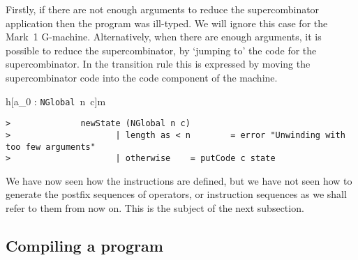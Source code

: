 Firstly, if there are not enough arguments to reduce the
supercombinator application then the program was ill-typed. We will
ignore this case for the Mark~1 G-machine. Alternatively, when there
are enough arguments, it is possible to reduce the supercombinator, by
`jumping to' the code for the supercombinator. In the transition
rule this is expressed by moving the supercombinator code into the
code component of the machine.

\gmrule%
{%
{h[a_0  :  \mbox{\tt NGlobal}\ n\  c]}{m}}%
{}
\begin{verbatim}
>              newState (NGlobal n c) 
>                     | length as < n        = error "Unwinding with too few arguments"
>                     | otherwise    = putCode c state
\end{verbatim}
We have now seen how the instructions are defined, but we have not
seen how to generate the postfix sequences of operators, or
instruction sequences as we shall refer to them from now on. This is
the subject of the next subsection.

\subsection{Compiling a program}
\label{gm:ss:compile}

